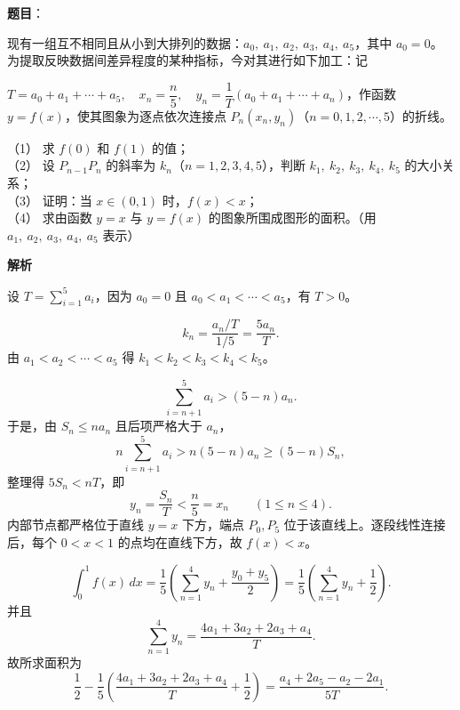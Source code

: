 \begin{answer}

\textbf{题目}：

现有一组互不相同且从小到大排列的数据：$a_0,\ a_1,\ a_2,\ a_3,\ a_4,\ a_5$，其中 $a_0=0$。为提取反映数据间差异程度的某种指标，今对其进行如下加工：记

$T=a_0+a_1+\cdots+a_5,\quad x_n=\dfrac n5,\quad y_n=\dfrac1T(a_0+a_1+\cdots+a_n)$，作函数 $y=f(x)$，使其图象为逐点依次连接点 $P_n(x_n,y_n)$（$n=0,1,2,\cdots,5$）的折线。

（1） 求 $f(0)$ 和 $f(1)$ 的值；\\
（2） 设 $P_{n-1}P_n$ 的斜率为 $k_n$（$n=1,2,3,4,5$），判断 $k_1,\ k_2,\ k_3,\ k_4,\ k_5$ 的大小关系；\\
（3） 证明：当 $x\in(0,1)$ 时，$f(x)<x$；\\
（4） 求由函数 $y=x$ 与 $y=f(x)$ 的图象所围成图形的面积。（用 $a_1,\ a_2,\ a_3,\ a_4,\ a_5$ 表示）

\textbf{解析}

设 $T=\sum_{i=1}^5a_i$，因为 $a_0=0$ 且 $a_0<a_1<\cdots<a_5$，有 $T>0$。


\nopagebreak[4]
\[k_n=\frac{a_n/T}{1/5}=\frac{5a_n}{T}.\]
由 $a_1<a_2<\cdots<a_5$ 得 $k_1<k_2<k_3<k_4<k_5$。

\nopagebreak[4]
\[\sum_{i=n+1}^5a_i>(5-n)a_n.\]
于是，由 $S_n\le na_n$ 且后项严格大于 $a_n$，
\nopagebreak[4]
\[n\sum_{i=n+1}^5a_i>n(5-n)a_n\ge(5-n)S_n,\]
整理得 $5S_n<nT$，即
\nopagebreak[4]
\[y_n=\frac{S_n}{T}<\frac n5=x_n\qquad(1\le n\le4).\]
内部节点都严格位于直线 $y=x$ 下方，端点 $P_0,P_5$ 位于该直线上。逐段线性连接后，每个 $0<x<1$ 的点均在直线下方，故 $f(x)<x$。

\nopagebreak[4]
\[\int_0^1f(x)\,dx=\frac15\left(\sum_{n=1}^4y_n+\frac{y_0+y_5}{2}\right)
=\frac15\left(\sum_{n=1}^4y_n+\frac12\right).\]
并且
\nopagebreak[4]
\[\sum_{n=1}^4y_n
=\frac{4a_1+3a_2+2a_3+a_4}{T}.\]
故所求面积为
\nopagebreak[4]
\[\frac12-\frac15\left(\frac{4a_1+3a_2+2a_3+a_4}{T}+\frac12\right)
=\frac{a_4+2a_5-a_2-2a_1}{5T}.\]





\end{answer}